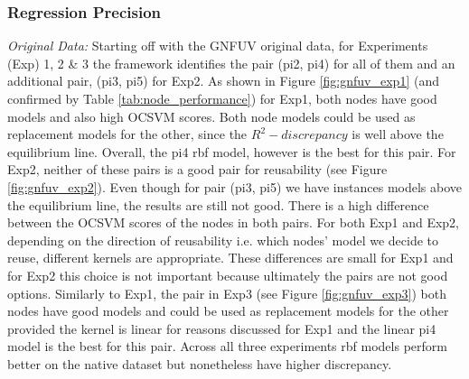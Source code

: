 \documentclass{mpaper}
\begin{document}
\subsubsection{Regression Precision}

\textit{Original Data:} {} Starting off with the GNFUV original data, for Experiments (Exp) 1, 2 \& 3 the framework identifies the pair (pi2, pi4) for all of them and an additional pair, (pi3, pi5) for Exp2. As shown in Figure \ref{fig:gnfuv_exp1} (and confirmed by Table \ref{tab:node_performance}) for Exp1, both nodes have good models and also high OCSVM scores. Both node models could be used as replacement models for the other, since the $R^2 - discrepancy$ is well above the equilibrium line. Overall, the pi4 rbf model, however is the best for this pair. For Exp2, neither of these pairs is a good pair for reusability (see Figure \ref{fig:gnfuv_exp2}). Even though for pair (pi3, pi5) we have instances models above the equilibrium line, the results are still not good.  There is a high difference between the OCSVM scores of the nodes in both pairs. For both Exp1 and Exp2, depending on the direction of reusability i.e. which nodes' model we decide to reuse, different kernels are appropriate. These differences are small for Exp1 and for Exp2 this choice is not important because ultimately the pairs are not good options. Similarly to Exp1, the pair in Exp3 (see Figure \ref{fig:gnfuv_exp3}) both nodes have good models and could be used as replacement models for the other provided the kernel is linear for reasons discussed for Exp1 and the linear pi4 model is the best for this pair. Across all three experiments rbf models perform better on the native dataset but nonetheless have higher discrepancy.
\end{document}
